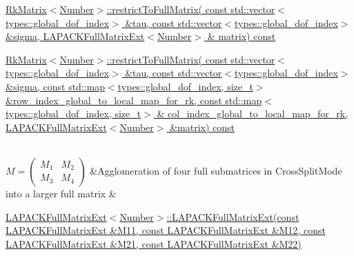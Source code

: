 \begin{longtabu}
\begin{DoxyItemize}
\item \hyperlink{classRkMatrix_a5305306386e47bcded819ce8d7f7935c}{Rk\+Matrix$<$\+Number$>$\+::restrict\+To\+Full\+Matrix( const std\+::vector$<$types\+::global\+\_\+dof\+\_\+index$>$ \&tau, const std\+::vector$<$types\+::global\+\_\+dof\+\_\+index$>$ \&sigma, L\+A\+P\+A\+C\+K\+Full\+Matrix\+Ext$<$\+Number$>$ \& matrix) const}
\item \hyperlink{classRkMatrix_a0c529b22a8a38c4046a93c4a16ad39ca}{Rk\+Matrix$<$\+Number$>$\+::restrict\+To\+Full\+Matrix( const std\+::vector$<$types\+::global\+\_\+dof\+\_\+index$>$ \&tau, const std\+::vector$<$types\+::global\+\_\+dof\+\_\+index$>$ \&sigma, const std\+::map$<$types\+::global\+\_\+dof\+\_\+index, size\+\_\+t$>$ \&row\+\_\+index\+\_\+global\+\_\+to\+\_\+local\+\_\+map\+\_\+for\+\_\+rk, const std\+::map$<$types\+::global\+\_\+dof\+\_\+index, size\+\_\+t$>$ \& col\+\_\+index\+\_\+global\+\_\+to\+\_\+local\+\_\+map\+\_\+for\+\_\+rk, L\+A\+P\+A\+C\+K\+Full\+Matrix\+Ext$<$\+Number$>$ \&matrix) const}
\end{DoxyItemize}\\
$M = \begin{pmatrix} M_1 & M_2 \\ M_3 & M_4 \end{pmatrix}$ &Agglomeration of four full submatrices in {\ttfamily Cross\+Split\+Mode} into a larger full matrix &
\begin{DoxyItemize}
\item \hyperlink{classLAPACKFullMatrixExt_aa94c466249d0df9e122443c0b6263cf3}{L\+A\+P\+A\+C\+K\+Full\+Matrix\+Ext$<$\+Number$>$\+::\+L\+A\+P\+A\+C\+K\+Full\+Matrix\+Ext(const L\+A\+P\+A\+C\+K\+Full\+Matrix\+Ext \&\+M11, const L\+A\+P\+A\+C\+K\+Full\+Matrix\+Ext \&\+M12, const L\+A\+P\+A\+C\+K\+Full\+Matrix\+Ext \&\+M21, const L\+A\+P\+A\+C\+K\+Full\+Matrix\+Ext \&\+M22)}

\end{DoxyItemize}
\end{longtabu}
